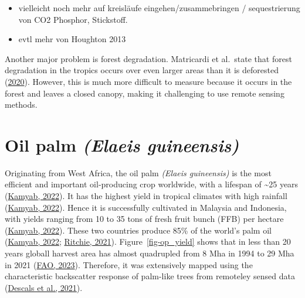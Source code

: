 \documentclass[
  letterpaper,
  DIV=11,
  numbers=noendperiod]{scrreprt}
\providecommand{\tightlist}{%
  \setlength{\itemsep}{0pt}\setlength{\parskip}{0pt}}\usepackage{longtable,booktabs,array}
\begin{document}
\begin{itemize}
\tightlist
\item
  vielleicht noch mehr auf kreisläufe eingehen/zusammebringen /
  sequestrierung von CO2 Phosphor, Stickstoff.
\item
  evtl mehr von Houghton 2013
\end{itemize}

Another major problem is forest degradation. Matricardi et al.~state
that forest degradation in the tropics occurs over even larger areas
than it is deforested
(\protect\hyperlink{ref-matricardiLongtermForestDegradation2020}{2020}).
However, this is much more difficult to measure because it occurs in the
forest and leaves a closed canopy, making it challenging to use remote
sensing methods.

\hypertarget{sec-oilpalm}{%
\section{\texorpdfstring{Oil palm \emph{(Elaeis
guineensis)}}{Oil palm (Elaeis guineensis)}}\label{sec-oilpalm}}

Originating from West Africa, the oil palm \emph{(Elaeis guineensis)} is
the most efficient and important oil-producing crop worldwide, with a
lifespan of \textasciitilde25 years
(\protect\hyperlink{ref-kamyabElaeisGuineensis2022}{Kamyab, 2022}). It
has the highest yield in tropical climates with high rainfall
(\protect\hyperlink{ref-kamyabElaeisGuineensis2022}{Kamyab, 2022}).
Hence it is successfully cultivated in Malaysia and Indonesia, with
yields ranging from 10 to 35 tons of fresh fruit bunch (FFB) per hectare
(\protect\hyperlink{ref-kamyabElaeisGuineensis2022}{Kamyab, 2022}).
These two countries produce 85\% of the world's palm oil
(\protect\hyperlink{ref-kamyabElaeisGuineensis2022}{Kamyab, 2022};
\protect\hyperlink{ref-ritchiePalmOil2021}{Ritchie, 2021}).
Figure~\ref{fig-op_yield} shows that in less than 20 years globall
harvest area has almost quadrupled from 8 Mha in 1994 to 29 Mha in 2021
(\protect\hyperlink{ref-faoFAOSTATDatabase2023}{FAO, 2023}). Therefore,
it was extensively mapped using the characteristic backscatter response
of palm-like trees from remoteley sensed data
(\protect\hyperlink{ref-descalsHighresolutionGlobalMap2021}{Descals et
al., 2021}).
\end{document}
